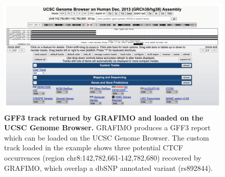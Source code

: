 \documentclass[a4paper, titlepage, openright]{book}
\newcommand{\grafimo}{GRAFIMO\xspace}
\begin{document}
\begin{figure}
    \centering
    \includegraphics[width=\textwidth]{figures/grafimo-genome-browser.png}
    \caption[GFF3 track returned by \grafimo and loaded on the UCSC Genome Browser]{\textbf{GFF3 track returned by GRAFIMO and loaded on the UCSC Genome Browser.} \grafimo produces a GFF3 report which can be loaded on the UCSC Genome Browser. The custom track loaded in the example shows three potential CTCF occurrences (region chr8:142,782,661-142,782,680) recovered by \grafimo, which overlap a dbSNP annotated variant (rs892844).}
    \label{fig:grafimo-genome-browser}
\end{figure}

\end{document}

